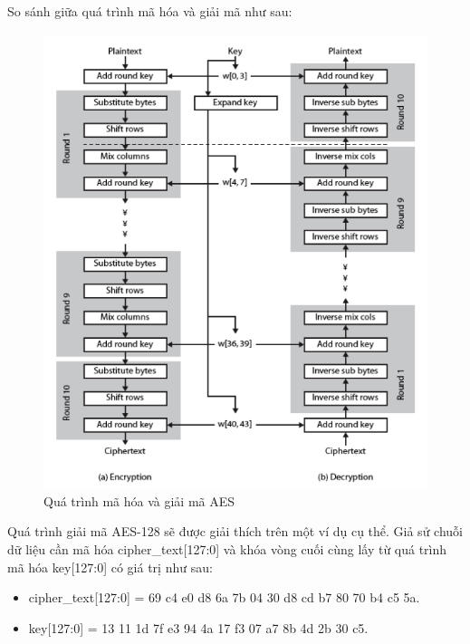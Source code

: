 So sánh giữa quá trình mã hóa và giải mã như sau:

\begin{figure}[H]
    \centering
    \includegraphics[scale=1.4]{pic/huê/AES mã hóa và giải mã.png}
    
    
    \caption{Quá trình mã hóa và giải mã AES}
\end{figure}

Quá trình giải mã AES-128 sẽ được giải thích trên một ví dụ cụ thể. Giả sử chuỗi dữ liệu cần mã hóa cipher\_text[127:0] và khóa vòng cuối cùng lấy từ quá trình mã hóa key[127:0] có giá trị như sau:
\begin{itemize}
    \item cipher\_text[127:0] =  69 c4 e0 d8 6a 7b 04 30 d8 cd b7 80 70 b4 c5 5a.
    \item key[127:0] = 13 11 1d 7f e3 94 4a 17 f3 07 a7 8b 4d 2b 30 c5.
\end{itemize}


